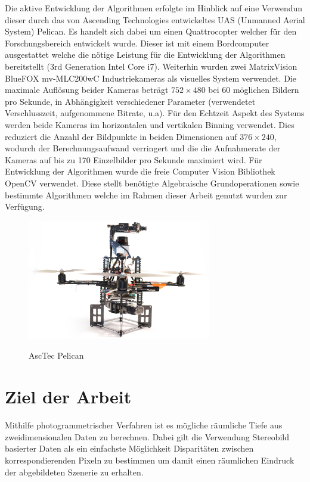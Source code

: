 Die aktive Entwicklung der Algorithmen erfolgte im Hinblick auf eine Verwendun dieser durch das von Ascending Technologies \cite{asctec} entwickeltes UAS (Unmanned Aerial System) Pelican. %
Es handelt sich dabei um einen Quattrocopter welcher für den Forschungsbereich entwickelt wurde. Dieser ist mit einem Bordcomputer ausgestattet welche die nötige Leistung für die Entwicklung der Algorithmen bereitstellt (3rd Generation Intel Core i7). Weiterhin wurden zwei MatrixVision BlueFOX mv-MLC200wC Industriekameras als visuelles System verwendet. Die maximale Auflösung beider Kameras beträgt $752\times480$ bei 60 möglichen Bildern pro Sekunde, in Abhängigkeit verschiedener Parameter (verwendetet Verschlusszeit, aufgenommene Bitrate, u.a). Für den Echtzeit Aspekt des Systems werden beide Kameras im horizontalen und vertikalen Binning verwendet. Dies reduziert die Anzahl der Bildpunkte in beiden Dimensionen auf $376\times240$, wodurch der Berechnungsaufwand verringert und die die Aufnahmerate der Kameras auf bis zu 170 Einzelbilder pro Sekunde maximiert wird.
	\noindent
Für Entwicklung der Algorithmen wurde die freie Computer Vision Bibliothek OpenCV \cite{opencv} verwendet. Diese stellt benötigte Algebraische Grundoperationen sowie bestimmte Algorithmen welche im Rahmen dieser Arbeit genutzt wurden zur Verfügung.

\begin{figure}
	\centering
	\includegraphics[width=8cm]{img/pelican}
	\label{img:pelican}
	\caption{AscTec Pelican}
\end{figure}


\section{Ziel der Arbeit}
\label{sec:ziel_der_arbeit}
Mithilfe photogrammetrischer Verfahren ist es mögliche räumliche Tiefe aus zweidimensionalen Daten zu berechnen. Dabei gilt die Verwendung Stereobild basierter Daten als ein einfachste Möglichkeit Disparitäten zwischen korrespondierenden Pixeln zu bestimmen um damit einen räumlichen Eindruck der abgebildeten Szenerie zu erhalten. \\

